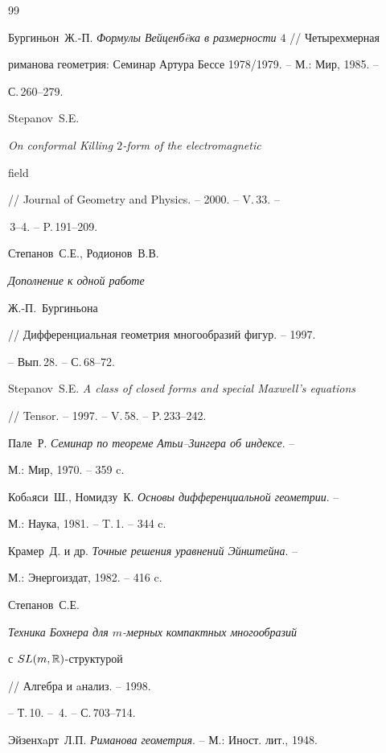 \begin{thebibliography}{99}







Бургиньон~Ж.-П. {\it Формулы Вейценб\"eка в размерности $4$} // Четырехмерная 


риманова геометрия: Семинар Артура Бессе 1978/1979. -- М.: Мир, 1985. --


С.\,260--279.




Stepanov~S.E. {\it On conformal Killing $2$-form of the electromagnetic


field} // Journal of Geometry and Physics. -- 2000. -- V.\,33. --


\No\,3--4. -- P.\,191--209.




Степанов~С.Е., Родионов~В.В. {\it Дополнение к одной работе


Ж.-П.~Бургиньона} // Дифференциальная геометрия многообразий фигур. -- 1997.


-- Вып.\,28. -- С.\,68--72.




Stepanov~S.E. {\it A class of closed forms and special Maxwell's equations}


// Tensor. -- 1997. -- V.\,58. -- P.\,233--242.




Пале~Р. {\it Семинар по теореме Атьи--Зингера об индексе}. --


М.: Мир, 1970. -- 359 c.




Кобaяси~Ш., Номидзу~К. {\it Основы дифференциальной геометрии}. --


М.: Наука, 1981. -- T.\,1. -- 344 c.




Крамер~Д. и др. {\it Точные решения уравнений Эйнштейна}. --


М.: Энергоиздат, 1982. -- 416 c.




Степанов~С.Е. {\it Техника Бохнера для $m$-мерных компактных многообразий


с $SL(m,\Bbb R)$-структурой} // Алгебра и aнализ. -- 1998.


-- Т.\,10. -- \No\,4. -- С.\,703--714.




Эйзенхaрт~Л.П. {\it Риманова геометрия}. -- М.: Иност. лит., 1948.



\end{thebibliography}
